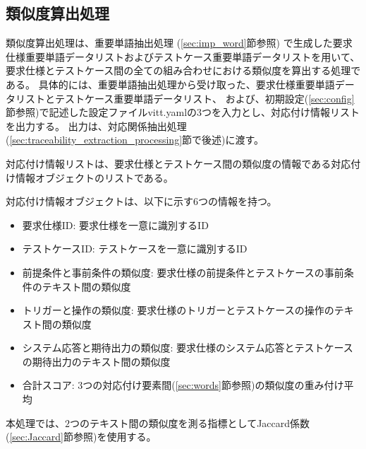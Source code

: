 \subsection{類似度算出処理}\label{subsec:similarity_calculation}
類似度算出処理は、重要単語抽出処理 (\cref{sec:imp_word}節参照) で生成した要求仕様重要単語データリストおよびテストケース重要単語データリストを用いて、
要求仕様とテストケース間の全ての組み合わせにおける類似度を算出する処理である。
具体的には、重要単語抽出処理から受け取った、要求仕様重要単語データリストとテストケース重要単語データリスト、
および、初期設定(\ref{sec:config}節参照)で記述した設定ファイルvitt.yamlの3つを入力とし、対応付け情報リストを出力する。
出力は、対応関係抽出処理(\ref{sec:traceability_extraction_processing}節で後述)に渡す。

対応付け情報リストは、要求仕様とテストケース間の類似度の情報である対応付け情報オブジェクトのリストである。

対応付け情報オブジェクトは、以下に示す6つの情報を持つ。
\begin{itemize}
    \item 要求仕様ID: 要求仕様を一意に識別するID
    \item テストケースID: テストケースを一意に識別するID
    \item 前提条件と事前条件の類似度: 要求仕様の前提条件とテストケースの事前条件のテキスト間の類似度
    \item トリガーと操作の類似度: 要求仕様のトリガーとテストケースの操作のテキスト間の類似度
    \item システム応答と期待出力の類似度: 要求仕様のシステム応答とテストケースの期待出力のテキスト間の類似度
    \item 合計スコア: $3$つの対応付け要素間(\ref{sec:words}節参照)の類似度の重み付け平均
\end{itemize}

本処理では、$2$つのテキスト間の類似度を測る指標としてJaccard係数(\ref{sec:Jaccard}節参照)を使用する。

